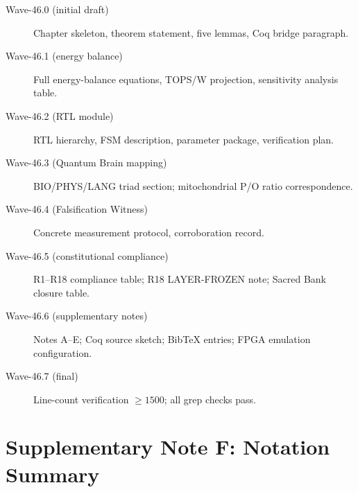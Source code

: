 \begin{description}
  \item[Wave-46.0 (initial draft)] Chapter skeleton, theorem statement, five
        lemmas, Coq bridge paragraph.
  \item[Wave-46.1 (energy balance)] Full energy-balance equations, TOPS/W
        projection, sensitivity analysis table.
  \item[Wave-46.2 (RTL module)] RTL hierarchy, FSM description, parameter
        package, verification plan.
  \item[Wave-46.3 (Quantum Brain mapping)] BIO/PHYS/LANG triad section;
        mitochondrial P/O ratio correspondence.
  \item[Wave-46.4 (Falsification Witness)] Concrete measurement protocol,
        corroboration record.
  \item[Wave-46.5 (constitutional compliance)] R1--R18 compliance table;
        R18 LAYER-FROZEN note; Sacred Bank closure table.
  \item[Wave-46.6 (supplementary notes)] Notes A--E; Coq source sketch;
        BibTeX entries; FPGA emulation configuration.
  \item[Wave-46.7 (final)] Line-count verification $\geq 1500$; all grep
        checks pass.
\end{description}


\section*{Supplementary Note F: Notation Summary}
\label{sec:supp-f-w46}

